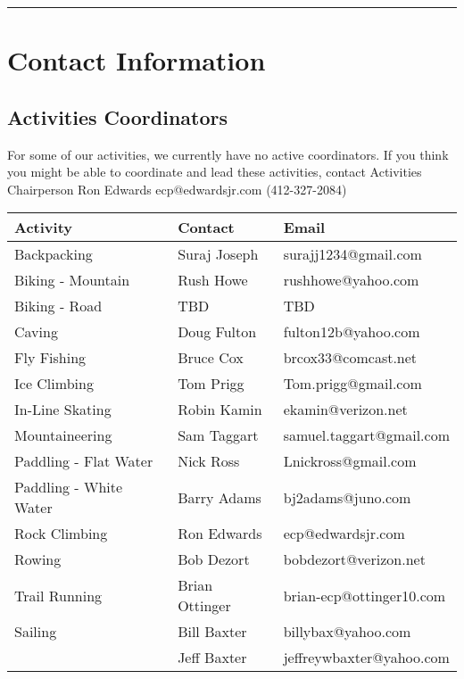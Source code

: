 \documentclass[10pt,a4paper]{article}
\begin{document}
\hrule

\clearpage
\pagebreak


\appendix

\section{Contact Information}

\subsection{Activities Coordinators}
For some of our activities, we currently have no active coordinators. If you think you might be able to coordinate
and lead these activities, contact Activities Chairperson Ron Edwards ecp@edwardsjr.com (412-327-2084)


\begin{center}
    \begin{tabular}{ | l | l | l | }
    \hline
    \textbf{Activity} & \textbf{Contact} & \textbf{Email} \\\hline
	Backpacking & Suraj Joseph & surajj1234@gmail.com \\ \hline
	Biking - Mountain & Rush Howe & rushhowe@yahoo.com \\ \hline
	Biking - Road & TBD & TBD \\ \hline
    Caving  & Doug Fulton & fulton12b@yahoo.com\\ \hline
    Fly Fishing & Bruce Cox & brcox33@comcast.net\\ \hline
    Ice Climbing & Tom Prigg & Tom.prigg@gmail.com\\ \hline
    In-Line Skating & Robin Kamin & ekamin@verizon.net\\ \hline
    Mountaineering & Sam Taggart & samuel.taggart@gmail.com\\ \hline
    Paddling - Flat Water & Nick Ross & Lnickross@gmail.com\\ \hline
    Paddling - White Water & Barry Adams & bj2adams@juno.com\\ \hline
    Rock Climbing & Ron Edwards & ecp@edwardsjr.com\\ \hline
    Rowing & Bob Dezort & bobdezort@verizon.net\\ \hline
    Trail Running & Brian Ottinger &  brian-ecp@ottinger10.com\\ \hline
    Sailing & Bill Baxter & billybax@yahoo.com\\ \hline
		   &  Jeff Baxter& jeffreywbaxter@yahoo.com\\ \hline

\end{tabular}
\end{center}
\end{document}

